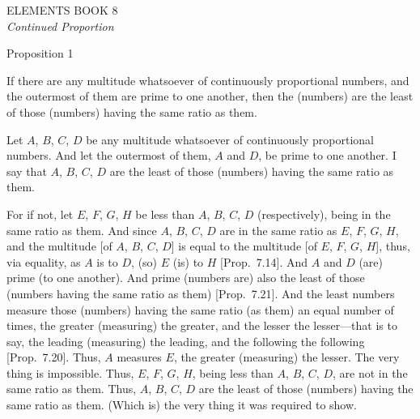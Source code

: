 \pagestyle{plain}
\begin{center}
{\Huge ELEMENTS BOOK 8}\\
\spa\spa\spa
{\huge\it Continued Proportion}
\end{center}\newpage

\pagestyle{fancy}
\cfoot{\gr{\thepage}}

\begin{center}
{\large Proposition 1}
\end{center}

If there are any multitude whatsoever of continuously proportional
numbers, and the outermost of them are prime to one another, then
the (numbers) are the least of those (numbers) having the same ratio as them.

\epsfysize=0.9in
\centerline{}

Let $A$, $B$, $C$,  $D$ be any multitude whatsoever of continuously proportional
numbers. And let the outermost of them, $A$ and $D$, be prime to
one another. I say that $A$, $B$, $C$, $D$ are the least of those
(numbers) having the same ratio as them.

For if not, let $E$, $F$, $G$, $H$ be less than $A$, $B$, $C$,  $D$ (respectively),
being in the same ratio as them. And since $A$, $B$, $C$, $D$ are
in the same ratio as $E$, $F$, $G$,  $H$, and
the multitude [of $A$, $B$, $C$, $D$] is equal to the
multitude [of $E$, $F$, $G$, $H$], thus, via equality, as
$A$ is to $D$, (so) $E$ (is) to $H$ [Prop.~7.14]. 
And $A$ and $D$ (are) prime (to one another). And prime (numbers are)
also the least of those (numbers having the same ratio as them) [Prop.~7.21]. And the least numbers measure those
(numbers) having the same ratio (as them) an equal number of times, the
greater (measuring) the greater, and the lesser the lesser---that is to say,
the leading (measuring) the leading, and the following the following [Prop.~7.20]. Thus, $A$ measures $E$, the
greater (measuring) the lesser. The very thing is impossible. Thus, $E$,
$F$, $G$,  $H$, being less than $A$, $B$, $C$, $D$, are not
in the same ratio as them. Thus, $A$, $B$, $C$,  $D$ are the least of those
(numbers) having the same ratio as them. (Which is) the very thing it was required to show.

